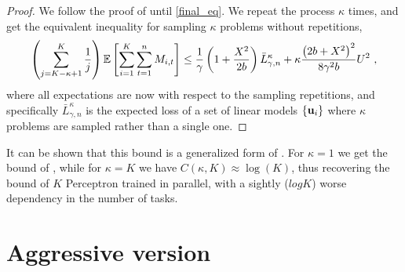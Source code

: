 \begin{proof}
  We follow the proof of  until \eqref{final_eq}. We
  repeat the process $\kappa$ times, and get the equivalent inequality
  for sampling $\kappa$ problems without repetitions,
\begin{equation}
\begin{split}
  \left({\sum_{j=K-\kappa+1}^{K}\frac{1}{j}}\right)\mathbb{E}\left[ \sum_{i=1}^{K}\sum_{t=1}^{n}{M_{i,t}} \right]
\le \frac{1}{\gamma}\left(1+\frac{X^2}{2b} \right){\bar L}^\kappa_{\gamma,n}
+\kappa\frac{\left({2b+X^2}\right)^2}{8{\gamma}^2b} U^2~,
\end{split}
\label{final_eq_k}
\end{equation}
where all expectations are now with respect to the sampling 
repetitions, and specifically ${\bar L}^\kappa_{\gamma,n}$ is the
expected loss of a set of linear models $\{ \mathbf{u}_{i} \}$ where $\kappa$
problems are sampled rather than a single one.
\QED
%
\end{proof}
It can be shown that this bound  is a generalized form of . For $\kappa=1$ we get the bound of , while for
$\kappa=K$ we have $C(\kappa,K)\approx\log(K)$, thus recovering the
bound of $K$ Perceptron trained in parallel, with a sightly ($log K$)
worse dependency in the number of tasks.

\section{Aggressive version}

